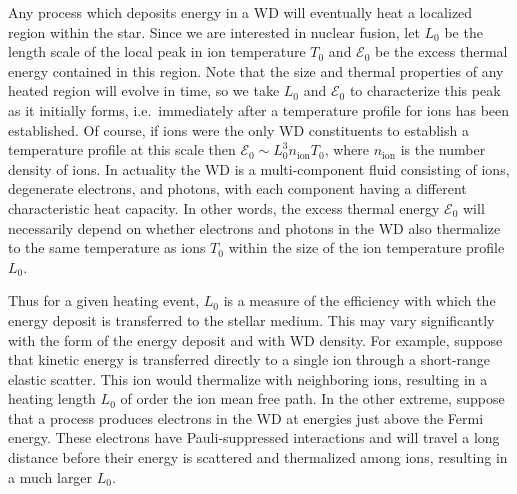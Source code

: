 \documentclass[twocolumn,preprintnumbers,amsmath,amssymb,prl, superscriptaddress]{revtex4}
\newcommand{\Ez}{\mathcal{E}_0}
\begin{document}
Any process which deposits energy in a WD will eventually heat a localized region within the star.
Since we are interested in nuclear fusion, let $L_0$ be the length scale of the local peak in ion temperature $T_0$ and $\Ez$ be the excess thermal energy contained in this region.
Note that the size and thermal properties of any heated region will evolve in time, so we take $L_0$ and $\Ez$ to characterize this peak as it initially forms, i.e.\ immediately after a temperature profile for ions has been established.
Of course, if ions were the only WD constituents to establish a temperature profile at this scale then $\Ez \sim L_0^3 n_\text{ion} T_0$, where $n_\text{ion}$ is the number density of ions.
In actuality the WD is a multi-component fluid consisting of ions, degenerate electrons, and photons, with each component having a different characteristic heat capacity. 
In other words, the excess thermal energy $\Ez$ will necessarily depend on whether electrons and photons in the WD also thermalize to the same temperature as ions $T_0$ within the size of the ion temperature profile $L_0$.  

Thus for a given heating event, $L_0$ is a measure of the efficiency with which the energy deposit is transferred to the stellar medium. 
This may vary significantly with the form of the energy deposit and with WD density.
For example, suppose that kinetic energy is transferred directly to a single ion through a short-range elastic scatter.
This ion would thermalize with neighboring ions, resulting in a heating length $L_0$ of order the ion mean free path.
In the other extreme, suppose that a process produces electrons in the WD at energies just above the Fermi energy.
These electrons have Pauli-suppressed interactions and will travel a long distance before their energy is scattered and thermalized among ions, resulting in a much larger $L_0$.
\end{document}

